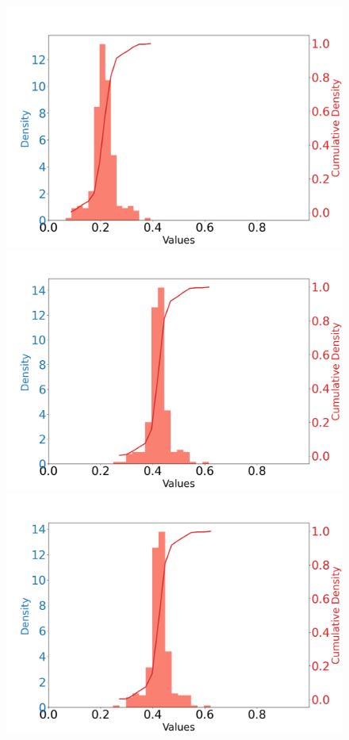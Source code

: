 \documentclass{article}
\begin{document}
\begin{figure}[htbp]
\begin{minipage}{0.195\textwidth}
    \includegraphics[scale=0.08]{figures/carry_density_idx_80_XCoord:0.19_YCoord:2.26.png}
    \end{minipage}
    \begin{minipage}{0.195\textwidth}
    \centering
    \includegraphics[scale=0.08]{figures/pass_density_idx_0_XCoord:-98.89_YCoord:13.33.png}
    \end{minipage}
    \begin{minipage}{0.195\textwidth}
    \centering
    \includegraphics[scale=0.08]{figures/pass_density_idx_120_XCoord:81.16_YCoord:37.97.png}

\end{minipage}
\end{figure}
\end{document}
